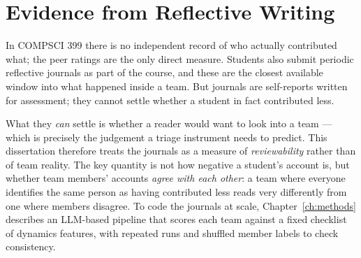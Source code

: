 \section{Evidence from Reflective Writing}
\label{sec:background-journals}

In COMPSCI 399 there is no independent record of who actually contributed what; the peer ratings are the only direct measure. Students also submit periodic reflective journals as part of the course, and these are the closest available window into what happened inside a team. But journals are self-reports written for assessment; they cannot settle whether a student in fact contributed less.

What they \emph{can} settle is whether a reader would want to look into a team — which is precisely the judgement a triage instrument needs to predict. This dissertation therefore treats the journals as a measure of \emph{reviewability} rather than of team reality. The key quantity is not how negative a student's account is, but whether team members' accounts \emph{agree with each other}: a team where everyone identifies the same person as having contributed less reads very differently from one where members disagree. To code the journals at scale, Chapter~\ref{ch:methods} describes an LLM-based pipeline that scores each team against a fixed checklist of dynamics features, with repeated runs and shuffled member labels to check consistency.
